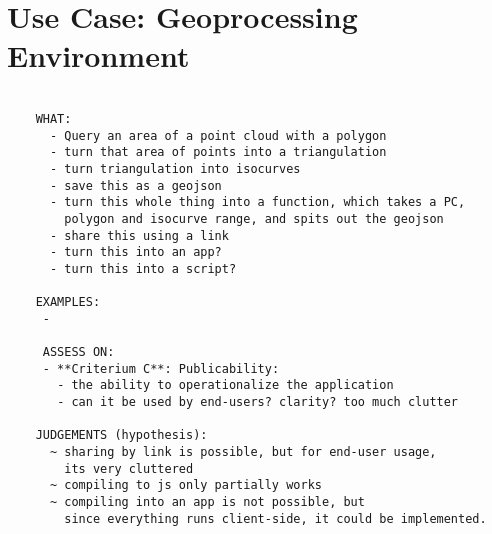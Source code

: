 \section{Use Case: Geoprocessing Environment}%
\begin{lstlisting}

    WHAT:
      - Query an area of a point cloud with a polygon
      - turn that area of points into a triangulation
      - turn triangulation into isocurves
      - save this as a geojson
      - turn this whole thing into a function, which takes a PC, 
        polygon and isocurve range, and spits out the geojson
      - share this using a link
      - turn this into an app?
      - turn this into a script?

    EXAMPLES: 
     - 

     ASSESS ON:
     - **Criterium C**: Publicability:
       - the ability to operationalize the application 
       - can it be used by end-users? clarity? too much clutter

    JUDGEMENTS (hypothesis): 
      ~ sharing by link is possible, but for end-user usage, 
        its very cluttered 
      ~ compiling to js only partially works
      ~ compiling into an app is not possible, but 
        since everything runs client-side, it could be implemented. 

\end{lstlisting}
